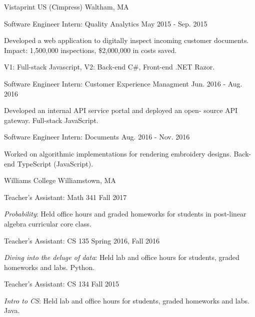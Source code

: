 \begin{cventries}
\cvexperienceheader
{Vistaprint US (Cimpress)} %
{Waltham, MA} %

\cvexperiencebody
{Software Engineer Intern: Quality Analytics} %
{May 2015 - Sep. 2015} %
{
  \begin{cvitems} %
    \item {Developed a web application to digitally inspect incoming customer documents. Impact: 1,500,000 inspections, \$2,000,000 in costs saved.}
    \item {V1: Full-stack Javascript, V2: Back-end C\#, Front-end .NET Razor.}
  \end{cvitems}
}
\cvexperiencebody
{Software Engineer Intern: Customer Experience Managment} %
{Jun. 2016 - Aug. 2016} %
{
  \begin{cvitems} %
    \item {Developed an internal API service portal and deployed an open- source API gateway. Full-stack JavaScript. }
  \end{cvitems}
}
\cvexperiencebody
{Software Engineer Intern: Documents} %
{Aug. 2016 - Nov. 2016} %
{
  \begin{cvitems} %
    \item {Worked on algorithmic implementations for rendering embroidery designs. Back-end TypeScript (JavaScript).}
  \end{cvitems}
}
\smallskip
\cvexperienceheader
{Williams College}
{Williamstown, MA}

\cvexperiencebody
{Teacher's Assistant: Math 341}
{Fall 2017}
{\begin{cvitems}
\item \textit{Probability}: Held office hours and graded homeworks for students in post-linear algebra curricular core class.
\end{cvitems}}
\cvexperiencebody
{Teacher's Assistant: CS 135}
{Spring 2016, Fall 2016}
{\begin{cvitems}
\item \textit{Diving into the deluge of data}: Held lab and office hours for students, graded homeworks and labs. Python.
\end{cvitems}}
\cvexperiencebody
{Teacher's Assistant: CS 134}
{Fall 2015}
{\begin{cvitems}
\item \textit{Intro to CS}: Held lab and office hours for students, graded homeworks and labs. Java.
\end{cvitems}}

\end{cventries}
